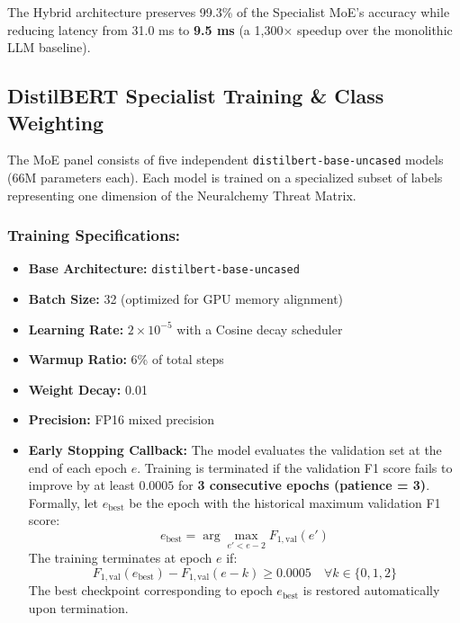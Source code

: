 \documentclass[11pt,a4paper]{article}
\begin{document}
The Hybrid architecture preserves 99.3\% of the Specialist MoE's accuracy while reducing latency from 31.0 ms to \textbf{9.5 ms} (a 1,300$\times$ speedup over the monolithic LLM baseline).

\subsection{DistilBERT Specialist Training \& Class Weighting}

The MoE panel consists of five independent \texttt{distilbert-base-uncased} models (66M parameters each). Each model is trained on a specialized subset of labels representing one dimension of the Neuralchemy Threat Matrix.

\subsubsection{Training Specifications:}
\begin{itemize}
    \item \textbf{Base Architecture:} \texttt{distilbert-base-uncased}
    \item \textbf{Batch Size:} 32 (optimized for GPU memory alignment)
    \item \textbf{Learning Rate:} $2 \times 10^{-5}$ with a Cosine decay scheduler
    \item \textbf{Warmup Ratio:} 6\% of total steps
    \item \textbf{Weight Decay:} 0.01
    \item \textbf{Precision:} FP16 mixed precision
    \item \textbf{Early Stopping Callback:} The model evaluates the validation set at the end of each epoch $e$. Training is terminated if the validation F1 score fails to improve by at least $0.0005$ for \textbf{3 consecutive epochs (patience = 3)}. Formally, let $e_{\text{best}}$ be the epoch with the historical maximum validation F1 score:
    \begin{equation}
        e_{\text{best}} = \arg\max_{e' < e - 2} F_{1, \text{val}}(e')
    \end{equation}
    The training terminates at epoch $e$ if:
    \begin{equation}
        F_{1, \text{val}}(e_{\text{best}}) - F_{1, \text{val}}(e - k) \ge 0.0005 \quad \forall k \in \{0, 1, 2\}
    \end{equation}
    The best checkpoint corresponding to epoch $e_{\text{best}}$ is restored automatically upon termination.
\end{itemize}
\end{document}
